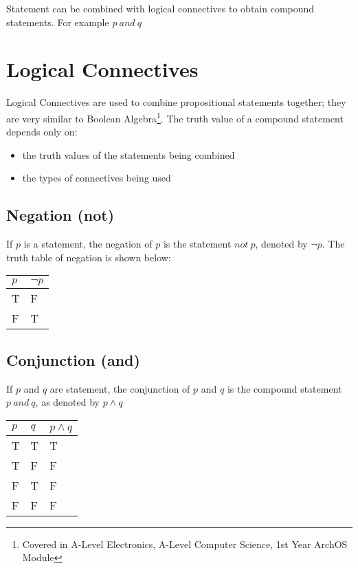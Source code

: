 Statement can be combined with logical connectives to obtain compound statements. For example $p\ and\ q$

\section{Logical Connectives}
Logical Connectives are used to combine propositional statements together; they are very similar to Boolean Algebra\footnote{Covered in A-Level Electronics, A-Level Computer Science, 1st Year ArchOS Module}. The truth value of a compound statement depends only on:
\begin{itemize}
    \item the truth values of the statements being combined
    \item the types of connectives being used
\end{itemize}

\subsection{Negation (not)}
If $p$ is a statement, the negation of $p$ is the statement $not\ p$, denoted by $\neg p$. The truth table of negation is shown below:
\begin{table}[H]
    \centering
    \begin{tabular}{C{0.1\textwidth} C{0.1\textwidth}}
        \textbf{$p$} & \textbf{$\neg p$}\\
        \hline
        \hline
        T & F \\
        \hline
        F & T \\
        \hline
    \end{tabular}
\end{table}

\subsection{Conjunction (and)}
If $p$ and $q$ are statement, the conjunction of $p$ and $q$ is the compound statement $p\ and\ q$, as denoted by $p \wedge q$
\begin{table}[H]
    \centering
    \begin{tabular}{C{0.1\textwidth} C{0.1\textwidth} C{0.1\textwidth}}
        $p$ & $q$ & $p \wedge q$\\
        \hline
        \hline
        T & T & T\\
        \hline
        T & F & F \\
        \hline
        F & T & F \\
        \hline
        F & F & F\\
        \hline
    \end{tabular}
\end{table}

